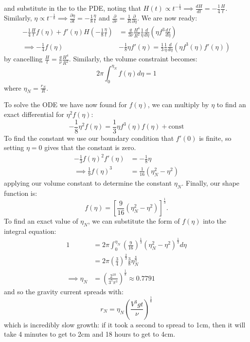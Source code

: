 \documentclass[../Main.tex]{subfiles}
\begin{document}
and substitute in the to the PDE, noting that $H(t) \propto t^{-\frac14} \implies \frac{dH}{dt} = -\frac14 \frac H t$. Similarly, $\eta \propto t^{-\frac18} \implies \frac{\partial \eta}{\partial t} = -\frac18 \frac\eta t$ and $\frac{\partial}{\partial r} = \frac1R \frac{\partial}{\partial \eta}$. We are now ready:
\begin{align*}
    -\frac14 \frac{H}{t} f(\eta) + f'(\eta) H \left(-\frac18 \frac{\eta}{t}\right) &= \frac{g}{3\nu} \frac{H^4}{R^2} \frac{1}{\eta} \frac{d}{d\eta} \left(\eta f^3 \frac{df}{d\eta}\right) \\
    \implies -\frac14 f(\eta) &- \frac18 \eta f'(\eta) = \frac13 \frac1\eta \frac{d}{d\eta} (\eta f^3(\eta) f'(\eta)) 
\end{align*}
by cancelling $\frac H t = \frac g \nu \frac{H^4}{R^2}$. Similarly, the volume constraint becomes:
\begin{equation*}
    2\pi \int_{0}^{\eta_N} f(\eta) d\eta = 1
\end{equation*}
where $\eta_N = \frac{r_N}{R}$.

To solve the ODE we have now found for $f(\eta)$, we can multiply by $\eta$ to find an exact differential for $\eta^2 f(\eta)$:
\begin{equation*}
    -\frac18 \eta^2 f(\eta) = \frac13 \eta f^3(\eta) f(\eta) + \text{const}
\end{equation*}
To find the constant we use our boundary condition that $f'(0)$ is finite, so setting $\eta = 0$ gives that the constant is zero.
\begin{align*}
    -\frac13 f(\eta)^2 f'(\eta) &= -\frac18 \eta \\
    \implies \frac19 f(\eta)^3 &= \frac1{16} (\eta_N^2 - \eta^2)
\end{align*}
applying our volume constant to determine the constant $\eta_N$. Finally, our shape function is:
\begin{equation*}
    f(\eta) = \left[\frac9{16} (\eta_N^2 - \eta^2)\right]^{\frac13}.
\end{equation*}
To find an exact value of $\eta_N$, we can substitute the form of $f(\eta)$ into the integral equation:
\begin{align*}
    1 &= 2\pi \int_{0}^{\eta_N} \left(\frac{9}{16}\right)^{\frac13} (\eta_N^2 - \eta^2)^{\frac13} d\eta \\
    &= 2\pi \left(\frac34\right)^{\frac23}\frac38 \eta_N^{\frac83} \\
    \implies \eta_N &= \left(\frac{2^{10}}{3^5 \pi^3}\right)^{\frac18} \approx 0.7791
\end{align*}
and so the gravity current spreads with:
\begin{equation*}
    r_N = \eta_N \left(\frac{V^3 gt}{\nu}\right)^{\frac18}
\end{equation*}
which is incredibly slow growth: if it took a second to spread to 1cm, then it will take 4 minutes to get to 2cm and 18 hours to get to 4cm.
\end{document}

